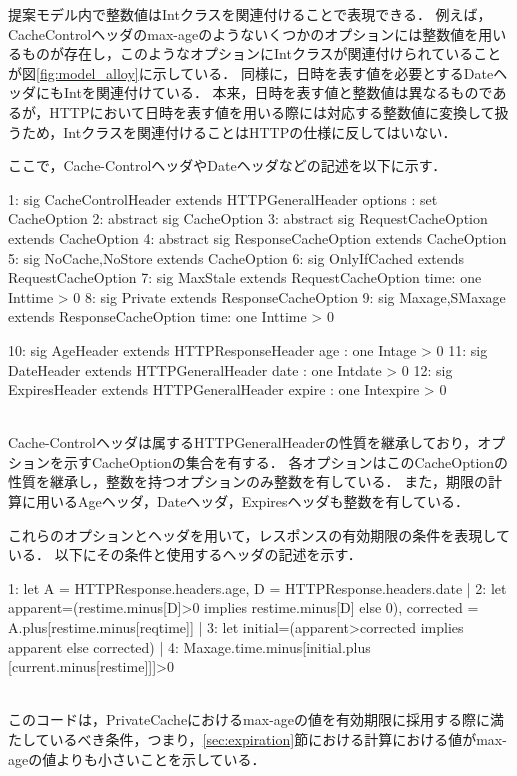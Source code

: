 \documentclass{css}
\begin{document}
提案モデル内で整数値はIntクラスを関連付けることで表現できる．
例えば，CacheControlヘッダのmax-ageのようないくつかのオプションには整数値を用いるものが存在し，このようなオプションにIntクラスが関連付けられていることが図\ref{fig:model_alloy}に示している．
同様に，日時を表す値を必要とするDateヘッダにもIntを関連付けている．
本来，日時を表す値と整数値は異なるものであるが，HTTPにおいて日時を表す値を用いる際には対応する整数値に変換して扱うため，Intクラスを関連付けることはHTTPの仕様に反してはいない．

ここで，Cache-ControlヘッダやDateヘッダなどの記述を以下に示す．\\\hrulefill
\begin{small}
\begin{verbatimtab}[4]
1:	sig CacheControlHeader extends HTTPGeneralHeader
		{options : set CacheOption}
2:	abstract sig CacheOption{}
3:	abstract sig RequestCacheOption
		extends CacheOption{}
4:	abstract sig ResponseCacheOption
		extends CacheOption{}
5:	sig NoCache,NoStore extends CacheOption{}
6:	sig OnlyIfCached extends RequestCacheOption{}
7:	sig MaxStale extends RequestCacheOption
		{time: one Int}{time > 0}
8:	sig Private extends ResponseCacheOption{}
9:	sig Maxage,SMaxage extends ResponseCacheOption
		{time: one Int}{time > 0}

10: sig AgeHeader extends HTTPResponseHeader
		{age : one Int}{age > 0}
11:	sig DateHeader extends HTTPGeneralHeader
		{date : one Int}{date > 0}
12:	sig ExpiresHeader extends HTTPGeneralHeader
		{expire : one Int}{expire > 0}
\end{verbatimtab}
\end{small}
\hrulefill\\
Cache-Controlヘッダは属するHTTPGeneralHeaderの性質を継承しており，オプションを示すCacheOptionの集合を有する．
各オプションはこのCacheOptionの性質を継承し，整数を持つオプションのみ整数を有している．
また，期限の計算に用いるAgeヘッダ，Dateヘッダ，Expiresヘッダも整数を有している．

これらのオプションとヘッダを用いて，レスポンスの有効期限の条件を表現している．
以下にその条件と使用するヘッダの記述を示す．\\\hrulefill
\begin{small}
\begin{verbatimtab}[4]
1:	let A = HTTPResponse.headers.age, 
	D = HTTPResponse.headers.date |
2:		let apparent=(restime.minus[D]>0 implies
		restime.minus[D] else 0), corrected = 
		A.plus[restime.minus[reqtime]] | 
3:			let initial=(apparent>corrected 
			implies apparent else corrected) | 
4:				Maxage.time.minus[initial.plus
				[current.minus[restime]]]>0
\end{verbatimtab}
\end{small}
\hrulefill\\
このコードは，PrivateCacheにおけるmax-ageの値を有効期限に採用する際に満たしているべき条件，つまり，\ref{sec:expiration}節における計算における値がmax-ageの値よりも小さいことを示している．
\end{document}
